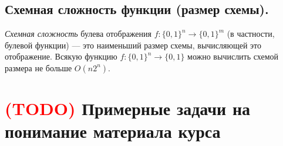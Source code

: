 \subsection{Схемная сложность функции (размер схемы).}
\textit{Схемная сложность} булева отображения $f : \{0, 1\}^n \to \{0, 1\}^m$ (в частности, булевой функции) — это наименьший размер схемы, вычисляющей это отображение.
\newline
\newline
Всякую функцию $f : \{0, 1\}^n \to \{0, 1\}$ можно вычислить схемой размера не больше $O(n2^n)$.




\newpage


\section{\textcolor{red}{(TODO)} Примерные задачи на понимание материала курса}
 
\subsection*{\normalsize{}} 